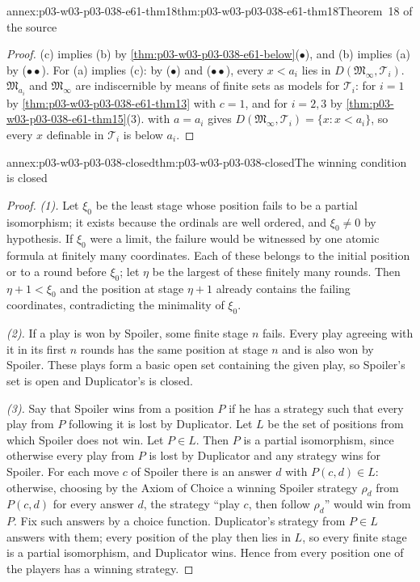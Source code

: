 \begin{annexitem}{annex:p03-w03-p03-038-e61-thm18}{thm:p03-w03-p03-038-e61-thm18}{Theorem~18 of the source}
\begin{proof}
(c) implies (b) by \cref{thm:p03-w03-p03-038-e61-below}(\(\bullet\)), and
(b) implies (a) by (\(\bullet\bullet\)). For (a) implies (c): by
(\(\bullet\)) and (\(\bullet\bullet\)), every \(x<a_i\) lies in
\(D(\mathfrak M_\infty,\mathcal T_i)\). \(\mathfrak M_{a_i}\) and
\(\mathfrak M_\infty\) are indiscernible by means of finite sets as models
for \(\mathcal T_i\): for \(i=1\) by \cref{thm:p03-w03-p03-038-e61-thm13}
with \(c=1\), and for \(i=2,3\) by
\cref{thm:p03-w03-p03-038-e61-thm15}(3). 
with \(a=a_i\) gives \(D(\mathfrak M_\infty,\mathcal T_i)=\{x:x<a_i\}\),
so every \(x\) definable in \(\mathcal T_i\) is below \(a_i\).
\end{proof}
\end{annexitem}

\begin{annexitem}{annex:p03-w03-p03-038-closed}{thm:p03-w03-p03-038-closed}{The winning condition is closed}
\begin{proof}
\emph{(1).} Let \(\xi_0\) be the least stage whose position fails to be a
partial isomorphism; it exists because the ordinals are well ordered, and
\(\xi_0\ne0\) by hypothesis. If \(\xi_0\) were a limit, the failure would be
witnessed by one atomic formula at finitely many coordinates. Each of these
belongs to the initial position or to a round before \(\xi_0\); let \(\eta\)
be the largest of these finitely many rounds. Then \(\eta+1<\xi_0\) and the
position at stage \(\eta+1\) already contains the failing coordinates,
contradicting the minimality of \(\xi_0\).

\emph{(2).} If a play is won by Spoiler, some finite stage \(n\) fails. Every
play agreeing with it in its first \(n\) rounds has the same position at
stage \(n\) and is also won by Spoiler. These plays form a basic open set
containing the given play, so Spoiler's set is open and Duplicator's is
closed.

\emph{(3).} Say that Spoiler wins from a position \(P\) if he has a strategy
such that every play from \(P\) following it is lost by Duplicator. Let
\(L\) be the set of positions from which Spoiler does not win. Let
\(P\in L\). Then \(P\) is a partial isomorphism, since otherwise every play
from \(P\) is lost by Duplicator and any strategy wins for Spoiler. For each
move \(c\) of Spoiler there is an answer \(d\) with \(P(c,d)\in L\): otherwise,
choosing by the Axiom of Choice a winning Spoiler strategy \(\rho_d\) from
\(P(c,d)\) for every answer \(d\), the strategy ``play \(c\), then follow
\(\rho_d\)'' would win from \(P\). Fix such answers by a choice function.
Duplicator's strategy from \(P\in L\) answers with them; every position of
the play then lies in \(L\), so every finite stage is a partial
isomorphism, and Duplicator wins. Hence from every position one of the
players has a winning strategy.
\end{proof}
\end{annexitem}


